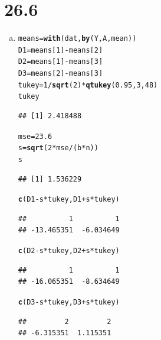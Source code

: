 \documentclass{article}\usepackage[]{graphicx}\usepackage[]{color}
\makeatletter
\newcommand{\hlnum}[1]{\textcolor[rgb]{0.686,0.059,0.569}{#1}}%
\newcommand{\hlopt}[1]{\textcolor[rgb]{0,0,0}{#1}}%
\newcommand{\hlstd}[1]{\textcolor[rgb]{0.345,0.345,0.345}{#1}}%
\newcommand{\hlkwb}[1]{\textcolor[rgb]{0.69,0.353,0.396}{#1}}%
\newcommand{\hlkwd}[1]{\textcolor[rgb]{0.737,0.353,0.396}{\textbf{#1}}}%
\newenvironment{kframe}{%
 \def\at@end@of@kframe{}%
 \ifinner\ifhmode%
  \def\at@end@of@kframe{\end{minipage}}%
  \begin{minipage}{\columnwidth}%
 \fi\fi%
 \def\FrameCommand##1{\hskip\@totalleftmargin \hskip-\fboxsep
 \colorbox{shadecolor}{##1}\hskip-\fboxsep
     \hskip-\linewidth \hskip-\@totalleftmargin \hskip\columnwidth}%
 \MakeFramed {\advance\hsize-\width
   \@totalleftmargin\z@ \linewidth\hsize
   \@setminipage}}%
 {\par\unskip\endMakeFramed%
 \at@end@of@kframe}
\newenvironment{knitrout}{}{} %
\makeatother
\begin{document}
\section{26.6}

\begin{enumerate}[(a)]

\item

\begin{knitrout}
\color{fgcolor}\begin{kframe}
\begin{alltt}
  \hlstd{means} \hlkwb{=} \hlkwd{with}\hlstd{(dat,} \hlkwd{by}\hlstd{(Y, A, mean))}
  \hlstd{D1} \hlkwb{=} \hlstd{means[}\hlnum{1}\hlstd{]} \hlopt{-} \hlstd{means[}\hlnum{2}\hlstd{]}
  \hlstd{D2} \hlkwb{=} \hlstd{means[}\hlnum{1}\hlstd{]} \hlopt{-} \hlstd{means[}\hlnum{3}\hlstd{]}
  \hlstd{D3} \hlkwb{=} \hlstd{means[}\hlnum{2}\hlstd{]} \hlopt{-} \hlstd{means[}\hlnum{3}\hlstd{]}
  \hlstd{tukey} \hlkwb{=} \hlnum{1}\hlopt{/}\hlkwd{sqrt}\hlstd{(}\hlnum{2}\hlstd{)}\hlopt{*}\hlkwd{qtukey}\hlstd{(}\hlnum{0.95}\hlstd{,} \hlnum{3}\hlstd{,} \hlnum{48}\hlstd{)}
  \hlstd{tukey}
\end{alltt}
\begin{verbatim}
## [1] 2.418488
\end{verbatim}
\begin{alltt}
  \hlstd{mse} \hlkwb{=} \hlnum{23.6}
  \hlstd{s} \hlkwb{=} \hlkwd{sqrt}\hlstd{(}\hlnum{2}\hlopt{*}\hlstd{mse}\hlopt{/}\hlstd{(b}\hlopt{*}\hlstd{n))}
  \hlstd{s}
\end{alltt}
\begin{verbatim}
## [1] 1.536229
\end{verbatim}
\begin{alltt}
  \hlkwd{c}\hlstd{(D1}\hlopt{-}\hlstd{s}\hlopt{*}\hlstd{tukey, D1}\hlopt{+}\hlstd{s}\hlopt{*}\hlstd{tukey)}
\end{alltt}
\begin{verbatim}
##          1          1 
## -13.465351  -6.034649
\end{verbatim}
\begin{alltt}
  \hlkwd{c}\hlstd{(D2}\hlopt{-}\hlstd{s}\hlopt{*}\hlstd{tukey, D2}\hlopt{+}\hlstd{s}\hlopt{*}\hlstd{tukey)}
\end{alltt}
\begin{verbatim}
##          1          1 
## -16.065351  -8.634649
\end{verbatim}
\begin{alltt}
  \hlkwd{c}\hlstd{(D3}\hlopt{-}\hlstd{s}\hlopt{*}\hlstd{tukey, D3}\hlopt{+}\hlstd{s}\hlopt{*}\hlstd{tukey)}
\end{alltt}
\begin{verbatim}
##         2         2 
## -6.315351  1.115351
\end{verbatim}
\end{kframe}
\end{knitrout}


\end{enumerate}
\end{document}
